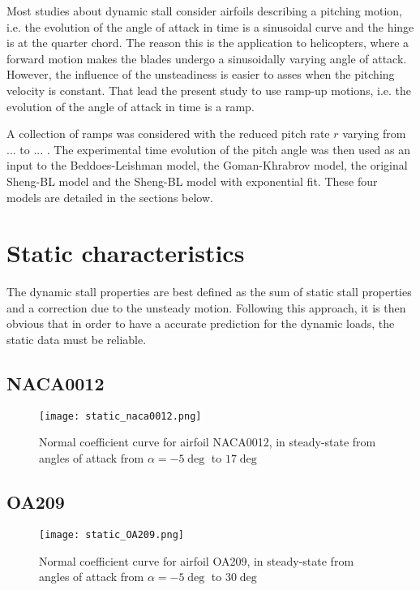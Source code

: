 Most studies about dynamic stall consider airfoils describing a pitching motion, i.e. the evolution of the angle of attack in time is a sinusoidal curve and the hinge is at the quarter chord. The reason this is the application to helicopters, where a forward motion makes the blades undergo a sinusoidally varying angle of attack. However, the influence of the unsteadiness is easier to asses when the pitching velocity is constant. That lead the present study to use ramp-up motions, i.e. the evolution of the angle of attack in time is a ramp. 

A collection of ramps was considered with the reduced pitch rate $r$ varying from ... to ... . The experimental time evolution of the pitch angle was then used as an input to the Beddoes-Leishman model, the Goman-Khrabrov model, the original Sheng-BL model and the Sheng-BL model with exponential fit. These four models are detailed in the sections below. 

\section{Static characteristics}

The dynamic stall properties are best defined as the sum of static stall properties and a correction due to the unsteady motion. Following this approach, it is then obvious that in order to have a accurate prediction for the dynamic loads, the static data must be reliable. 

\subsection{NACA0012}

\begin{figure}[h]
\centering
\texttt{[image: static\_naca0012.png]}
\caption{Normal coefficient curve for airfoil NACA0012, in steady-state from angles of attack from $\alpha=-5 \deg$ to $17 \deg$}
\label{fig:static_flatplate}
\end{figure}


\subsection{OA209}
\begin{figure}[h]
\centering
\texttt{[image: static\_OA209.png]}
\caption{Normal coefficient curve for airfoil OA209, in steady-state from angles of attack from $\alpha=-5 \deg$ to $30 \deg$}
\label{fig:static_flatplate}
\end{figure}

